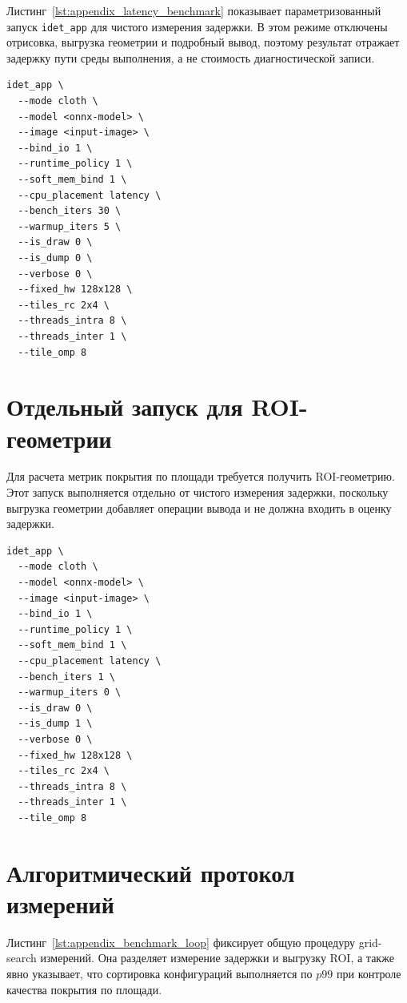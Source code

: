 \documentclass[12pt,a4paper,oneside,openany]{report}
\begin{document}
Листинг~\ref{lst:appendix_latency_benchmark} показывает параметризованный запуск \texttt{idet\_app} для чистого измерения задержки. В этом режиме отключены отрисовка, выгрузка геометрии и подробный вывод, поэтому результат отражает задержку пути среды выполнения, а не стоимость диагностической записи.

\begin{lstlisting}[caption={Параметризованный запуск \texttt{idet\_app} для чистого измерения задержки},label={lst:appendix_latency_benchmark}]
idet_app \
  --mode cloth \
  --model <onnx-model> \
  --image <input-image> \
  --bind_io 1 \
  --runtime_policy 1 \
  --soft_mem_bind 1 \
  --cpu_placement latency \
  --bench_iters 30 \
  --warmup_iters 5 \
  --is_draw 0 \
  --is_dump 0 \
  --verbose 0 \
  --fixed_hw 128x128 \
  --tiles_rc 2x4 \
  --threads_intra 8 \
  --threads_inter 1 \
  --tile_omp 8
\end{lstlisting}


\section{Отдельный запуск для ROI-геометрии}

Для расчета метрик покрытия по площади требуется получить ROI-геометрию. Этот запуск выполняется отдельно от чистого измерения задержки, поскольку выгрузка геометрии добавляет операции вывода и не должна входить в оценку задержки.

\begin{lstlisting}[caption={Отдельный запуск для выгрузки ROI-геометрии},label={lst:appendix_dump_benchmark}]
idet_app \
  --mode cloth \
  --model <onnx-model> \
  --image <input-image> \
  --bind_io 1 \
  --runtime_policy 1 \
  --soft_mem_bind 1 \
  --cpu_placement latency \
  --bench_iters 1 \
  --warmup_iters 0 \
  --is_draw 0 \
  --is_dump 1 \
  --verbose 0 \
  --fixed_hw 128x128 \
  --tiles_rc 2x4 \
  --threads_intra 8 \
  --threads_inter 1 \
  --tile_omp 8
\end{lstlisting}


\section{Алгоритмический протокол измерений}

Листинг~\ref{lst:appendix_benchmark_loop} фиксирует общую процедуру grid-search измерений. Она разделяет измерение задержки и выгрузку ROI, а также явно указывает, что сортировка конфигураций выполняется по $p99$ при контроле качества покрытия по площади.
\end{document}
